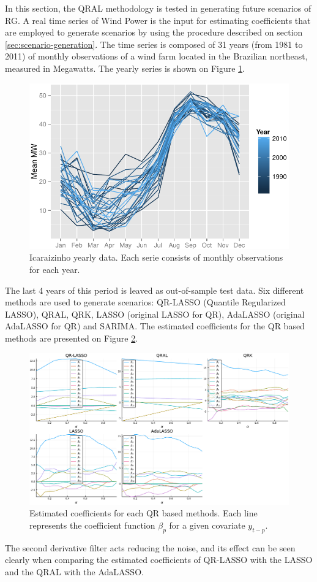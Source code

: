 In this section, the QRAL methodology is tested in generating future scenarios of RG. A real time series of Wind Power is the input for estimating coefficients that are employed to generate scenarios by using the procedure described on section \ref{sec:scenario-generation}.
The time series is composed of 31 years (from 1981 to 2011) of monthly observations  of a wind farm located in the Brazilian northeast, measured in Megawatts. The yearly series is shown on Figure \ref{fig:icaraizinho-mensal}.
\begin{figure}[h]
\centering
\includegraphics[width=0.8\linewidth]{Images/icaraizinho-mensal2}
\caption{Icaraizinho yearly data. Each serie consists of monthly observations for each year.}
\label{fig:icaraizinho-mensal}
\end{figure}

The last 4 years of this period is leaved as out-of-sample test data. Six different methods are used to generate scenarios: QR-LASSO (Quantile Regularized LASSO), QRAL, QRK, LASSO (original LASSO for QR), AdaLASSO (original AdaLASSO for QR) and SARIMA. The estimated coefficients for the QR based methods are presented on Figure \ref{fig:betas-icaraizinho}. 
\begin{figure}[h]
	\centering
	\includegraphics[width=1.0\linewidth]{Images/betas-icaraizinho}
	\caption{Estimated coefficients for each QR based methods. Each line represents the coefficient function $\beta_{p}$ for a given covariate $y_{t-p}$.}
	\label{fig:betas-icaraizinho}
\end{figure}
The second derivative filter acts reducing the noise, and its effect can be seen clearly when comparing the estimated coefficients of QR-LASSO with the LASSO and the QRAL with the AdaLASSO. 

